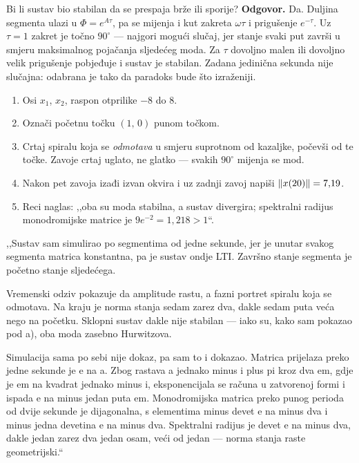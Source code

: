 \begin{pitanje}{Bi li sustav bio stabilan da se prespaja brže ili sporije?}
\textbf{Odgovor.} Da. Duljina segmenta ulazi u $\Phi = e^{A\tau}$, pa se mijenja
i kut zakreta $\omega\tau$ i prigušenje $e^{-\tau}$. Uz $\tau = 1$ zakret je
točno $90^\circ$ --- najgori mogući slučaj, jer stanje svaki put završi u smjeru
maksimalnog pojačanja sljedećeg moda. Za $\tau$ dovoljno malen ili dovoljno velik
prigušenje pobjeđuje i sustav je stabilan. Zadana jedinična sekunda nije
slučajna: odabrana je tako da paradoks bude što izraženiji.
\end{pitanje}

\begin{ploca}
\begin{enumerate}[leftmargin=*]
  \item Osi $x_1$, $x_2$, raspon otprilike $-8$ do $8$.
  \item Označi početnu točku $(1,\,0)$ punom točkom.
  \item Crtaj spiralu koja se \emph{odmotava} u smjeru suprotnom od kazaljke,
        počevši od te točke. Zavoje crtaj uglato, ne glatko --- svakih $90^\circ$
        mijenja se mod.
  \item Nakon pet zavoja izađi izvan okvira i uz zadnji zavoj napiši
        $\left\lVert x(20) \right\rVert = 7{,}19$.
  \item Reci naglas: ,,oba su moda stabilna, a sustav divergira; spektralni
        radijus monodromijske matrice je $9e^{-2} = 1{,}218 > 1$``.
\end{enumerate}
\end{ploca}

\begin{izgovor}
,,Sustav sam simulirao po segmentima od jedne sekunde, jer je unutar svakog
segmenta matrica konstantna, pa je sustav ondje LTI. Završno stanje segmenta je
početno stanje sljedećega.

Vremenski odziv pokazuje da amplitude rastu, a fazni portret spiralu koja se
odmotava. Na kraju je norma stanja sedam zarez dva, dakle sedam puta veća nego
na početku. Sklopni sustav dakle nije stabilan --- iako su, kako sam pokazao pod
a), oba moda zasebno Hurwitzova.

Simulacija sama po sebi nije dokaz, pa sam to i dokazao. Matrica prijelaza preko
jedne sekunde je e na a. Zbog rastava a jednako minus i plus pi kroz dva em, gdje
je em na kvadrat jednako minus i, eksponencijala se računa u zatvorenoj formi i
ispada e na minus jedan puta em. Monodromijska matrica preko punog perioda od
dvije sekunde je dijagonalna, s elementima minus devet e na minus dva i minus
jedna devetina e na minus dva. Spektralni radijus je devet e na minus dva, dakle
jedan zarez dva jedan osam, veći od jedan --- norma stanja raste geometrijski.``
\end{izgovor}
